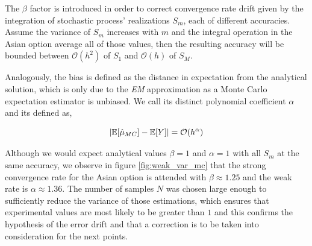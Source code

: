 The $\beta$ factor is introduced in order to correct convergence rate drift given by the integration of stochastic process' realizations $S_m$, each of different accuracies. Assume the variance of $S_m$ increases with $m$ and the integral operation in the Asian option average all of those values, then the resulting accuracy will be bounded between $\mathcal{O}(h^2)$ of $S_1$ and $\mathcal{O}(h)$ of $S_M$.

Analogously, the bias is defined as the distance in expectation from the analytical solution, which is only due to the \textit{EM} approximation as a Monte Carlo expectation estimator is unbiased. We call its distinct polynomial coefficient $\alpha$ and its defined as,

\begin{equation} \label{eq:bias_mc}
\lvert\mathbb{E}[\hat{\mu}_{MC}] - \mathbb{E}[Y]\rvert = \mathcal{O}(h^\alpha)
\end{equation}

Although we would expect analytical values $\beta = 1$ and $\alpha = 1$ with all $S_m$ at the same accuracy, we observe in figure \ref{fig:weak_var_mc} that the strong convergence rate for the Asian option is attended with $\beta \approx 1.25$ and the weak rate is $\alpha \approx 1.36$. The number of samples $N$ was chosen large enough to sufficiently reduce the variance of those estimations, which ensures that experimental values are most likely to be greater than $1$ and this confirms the hypothesis of the error drift and that a correction is to be taken into consideration for the next points.

